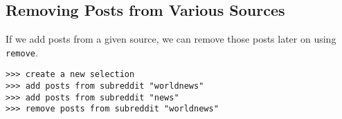 \subsection{Removing Posts from Various Sources}

If we add posts from a given source, we can remove those posts later on using \texttt{remove}.
\newline\begin{minipage}{\linewidth}\begin{lstlisting}
>>> create a new selection
>>> add posts from subreddit "worldnews"
>>> add posts from subreddit "news"
>>> remove posts from subreddit "worldnews"
\end{lstlisting}\end{minipage}
